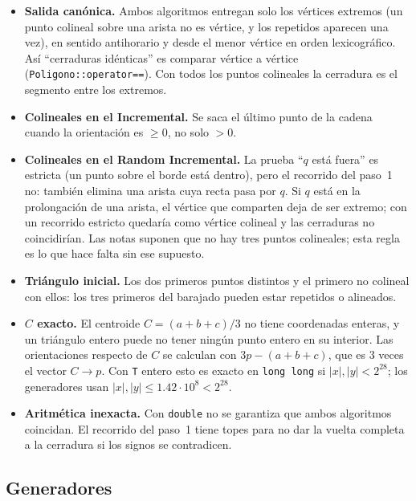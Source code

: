 \documentclass[11pt,letterpaper]{article}
\newcommand{\inc}{\textsf{Incremental}}
\newcommand{\ran}{\textsf{Random Incremental}}
\newcommand{\code}[1]{\texttt{#1}}
\begin{document}
\begin{itemize}
  \item \textbf{Salida canónica.} Ambos algoritmos entregan solo los vértices
        extremos (un punto colineal sobre una arista no es vértice, y los
        repetidos aparecen una vez), en sentido antihorario y desde el menor
        vértice en orden lexicográfico. Así ``cerraduras idénticas'' es
        comparar vértice a vértice (\code{Poligono::operator==}). Con todos los
        puntos colineales la cerradura es el segmento entre los extremos.
  \item \textbf{Colineales en el \inc.} Se saca el último punto de la cadena
        cuando la orientación es $\ge 0$, no solo $>0$.
  \item \textbf{Colineales en el \ran.} La prueba ``$q$ está fuera'' es estricta
        (un punto sobre el borde está dentro), pero el recorrido del paso~1 no:
        también elimina una arista cuya recta pasa por $q$. Si $q$ está en la
        prolongación de una arista, el vértice que comparten deja de ser
        extremo; con un recorrido estricto quedaría como vértice colineal y las
        cerraduras no coincidirían. Las notas suponen que no hay tres puntos
        colineales; esta regla es lo que hace falta sin ese supuesto.
  \item \textbf{Triángulo inicial.} Los dos primeros puntos distintos y el
        primero no colineal con ellos: los tres primeros del barajado pueden
        estar repetidos o alineados.
  \item \textbf{$C$ exacto.} El centroide $C=(a+b+c)/3$ no tiene coordenadas
        enteras, y un triángulo entero puede no tener ningún punto entero en su
        interior. Las orientaciones respecto de $C$ se calculan con $3p-(a+b+c)$,
        que es $3$ veces el vector $C\to p$. Con \code{T} entero esto es exacto
        en \code{long long} si $|x|,|y|<2^{28}$; los generadores usan
        $|x|,|y|\le 1.42\cdot 10^{8}<2^{28}$.
  \item \textbf{Aritmética inexacta.} Con \code{double} no se garantiza que
        ambos algoritmos coincidan. El recorrido del paso~1 tiene topes para no
        dar la vuelta completa a la cerradura si los signos se contradicen.
\end{itemize}

\subsection{Generadores}
\end{document}
